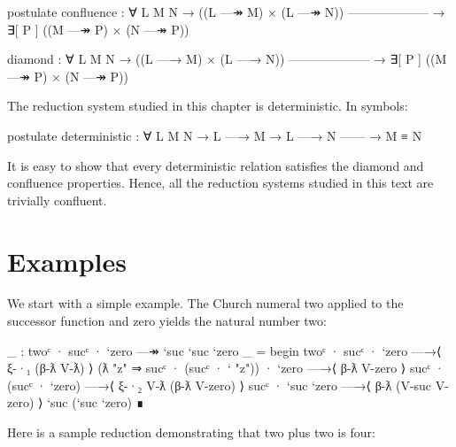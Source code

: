 \begin{fence}
\begin{code}
postulate
  confluence : ∀ {L M N}
    → ((L —↠ M) × (L —↠ N))
      --------------------
    → ∃[ P ] ((M —↠ P) × (N —↠ P))

  diamond : ∀ {L M N}
    → ((L —→ M) × (L —→ N))
      --------------------
    → ∃[ P ] ((M —↠ P) × (N —↠ P))
\end{code}
\end{fence}

The reduction system studied in this chapter is deterministic. In
symbols:

\begin{fence}
\begin{code}
postulate
  deterministic : ∀ {L M N}
    → L —→ M
    → L —→ N
      ------
    → M ≡ N
\end{code}
\end{fence}

It is easy to show that every deterministic relation satisfies the
diamond and confluence properties. Hence, all the reduction systems
studied in this text are trivially confluent.

\hypertarget{examples-1}{%
\section{Examples}\label{examples-1}}

We start with a simple example. The Church numeral two applied to the
successor function and zero yields the natural number two:

\begin{fence}
\begin{code}
_ : twoᶜ · sucᶜ · `zero —↠ `suc `suc `zero
_ =
  begin
    twoᶜ · sucᶜ · `zero
  —→⟨ ξ-·₁ (β-ƛ V-ƛ) ⟩
    (ƛ "z" ⇒ sucᶜ · (sucᶜ · ` "z")) · `zero
  —→⟨ β-ƛ V-zero ⟩
    sucᶜ · (sucᶜ · `zero)
  —→⟨ ξ-·₂ V-ƛ (β-ƛ V-zero) ⟩
    sucᶜ · `suc `zero
  —→⟨ β-ƛ (V-suc V-zero) ⟩
    `suc (`suc `zero)
  ∎
\end{code}
\end{fence}

Here is a sample reduction demonstrating that two plus two is four:

